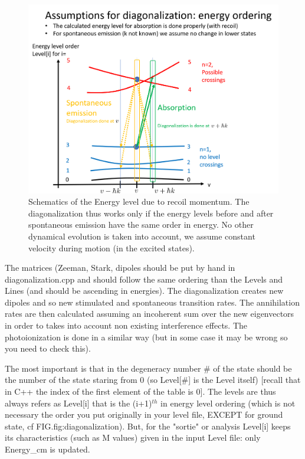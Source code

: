 \documentclass[amsmath,amssymb,nofootinbib]{revtex4-2}
\begin{document}
\begin{figure}
	\centering
	\includegraphics[width=0.6\linewidth]{diagonalization.png}
	\caption{Schematics of the Energy level due to recoil momentum. The diagonalization thus works only if the energy levels before and after spontaneous emission have the same order in energy. No other dynamical evolution is taken into account, we assume constant velocity during  motion (in the excited states).}
	\label{fig:diagonalization}
\end{figure}


The matrices (Zeeman, Stark, dipoles should be put by hand in diagonalization.cpp and should follow the same ordering than the Levels and Lines (and should be ascending in energies).
The diagonalization creates new dipoles and so new stimulated and spontaneous transition rates. 
The annihilation  rates are then calculated assuming an incoherent sum over the new eigenvectors in order to takes into account non existing interference effects. The photoionization is done in a similar way (but in some case it may be wrong so you need to check this).



The most important is that in the degeneracy number \# of the state should be the number of the state staring from 0 (so Level[\#] is the Level itself) [recall that in C++ the index of the first element of the table is 0].
The levels are thus always refers as Level[i] that is the (i+1)$^{th}$ in energy level ordering (which is not necessary the order you put originally in your level file, EXCEPT for ground state, cf FIG.{fig:diagonalization}). But, for the "sortie" or analysis Level[i] keeps its characteristics (such as M values) given in the input Level file: only Energy\_cm is updated.


\end{document}
